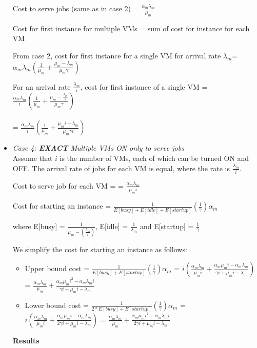 \documentclass[letter,11pt]{article}
\begin{document}
\begin{itemize}
Cost to serve jobs (same as in case 2)  = $\frac{\alpha_m \lambda_m}{\mu_m}$

Cost for first instance for multiple VMs = sum of cost for instance for each VM

From case 2, cost for first instance for a single VM for arrival rate $\lambda_m$= $\alpha_m \lambda_m(\frac{1}{\mu_m} + \frac{\mu_m - \lambda_m}{\mu_m \gamma}) $

For an arrival rate $\frac{\lambda_m}{i}$, cost for first instance of a single VM = $\frac{\alpha_m \lambda_m}{i} (\frac{1}{\mu_m} + \frac{\mu_m - \frac{\lambda_m}{i}}{\mu_m \gamma})$ \\ \\
 = $\frac{\alpha_m \lambda_m}{i} (\frac{1}{\mu_m} + \frac{\mu_m i - \lambda_m}{\mu_m \gamma i})$

\item \textit{Case 4: \textbf{EXACT} Multiple VMs ON only to serve jobs} \\
Assume that $i$ is the number of VMs, each of which can be turned ON and OFF. The arrival rate of jobs for each VM is equal, where the rate is $\frac{\lambda_m}{i}$.

Cost to serve job for each VM  = = $\frac{\alpha_m \lambda_m}{\mu_m i}$

Cost for starting an instance = $\frac{1}{E[busy] + E[idle] + E[startup]}(\frac{1}{\gamma})\alpha_m$ 

where E[busy] = $\frac{1}{\mu_m - (\frac{\lambda_m}{i})}$, E[idle] = $\frac{1}{\lambda_m}$ and E[startup] = $\frac{1}{\gamma}$

We simplify the cost for starting an instance as follows: 
\begin{itemize}
\item Upper bound cost = $\frac{1}{E[busy] + E[startup]}(\frac{1}{\gamma})\alpha_m$ = $i(\frac{\alpha_m \lambda_m}{\mu_m i} + \frac{\alpha_m \mu_m i - \alpha_m \lambda_m}{\gamma i + \mu_m i - \lambda_m})$ = $\frac{\alpha_m \lambda_m}{\mu_m} + \frac{\alpha_m \mu_m i^2 - \alpha_m \lambda_m i}{\gamma i + \mu_m i - \lambda_m}$
\item Lower bound cost = $\frac{1}{2 * E[busy] + E[startup]}(\frac{1}{\gamma})\alpha_m$ = $i(\frac{\alpha_m \lambda_m}{\mu_m i} + \frac{\alpha_m \mu_m i - \alpha_m \lambda_m}{2 \gamma i + \mu_m i - \lambda_m})$ = $\frac{\alpha_m \lambda_m}{\mu_m} + \frac{\alpha_m \mu_m i^2 - \alpha_m \lambda_m i}{2 \gamma i + \mu_m i - \lambda_m}$
\end{itemize}

\textbf{Results}


\end{itemize}
\end{document}
